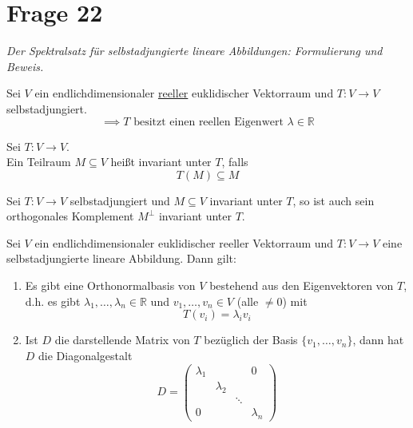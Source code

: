 \section{Frage 22}
\textit{Der Spektralsatz für selbstadjungierte lineare Abbildungen: Formulierung und Beweis.}
\begin{theorem}
    Sei $V$ ein endlichdimensionaler \underline{reeller} euklidischer Vektorraum und $T:V \to V$ selbstadjungiert.
    \[
        \implies T \text{ besitzt einen reellen Eigenwert } \lambda\in\mathbb{R}
    \]
\end{theorem}
\begin{definition}
    [Invariant] Sei $T: V\to V$.\\
    Ein Teilraum $M\subseteq V$ heißt invariant unter $T$, falls
    \[
        T(M)\subseteq M
    \]
\end{definition}
\begin{lemma}
    Sei $T:V\to V$ selbstadjungiert und $M\subseteq V$ invariant unter $T$, so ist auch sein orthogonales
    Komplement $M^\bot$ invariant unter $T$.
\end{lemma}
\begin{theorem}
    [Spektralsatz] Sei $V$ ein endlichdimensionaler euklidischer reeller Vektorraum und $T: V\to V$ eine
    selbstadjungierte lineare Abbildung. Dann gilt:
    \begin{enumerate}
        \item Es gibt eine Orthonormalbasis von $V$ bestehend aus den Eigenvektoren von $T$, d.h. es gibt
        $\lambda_1,\dots,\lambda_n\in\mathbb{R}$ und $v_1,\dots,v_n\in V$ (alle $\neq 0$) mit
        \[
            T(v_i)=\lambda_i v_i
        \]
        \item Ist $D$ die darstellende Matrix von $T$ bezüglich der Basis $\{v_1,\dots,v_n\}$, dann hat $D$ die
        Diagonalgestalt
        \[
            D = \begin{pmatrix}
                \lambda_1 & & & 0\\
                          & \lambda_2 & & \\
                          & & \ddots \\
                          0 & & & \lambda_n
            \end{pmatrix}
        \]
    \end{enumerate}
\end{theorem}
